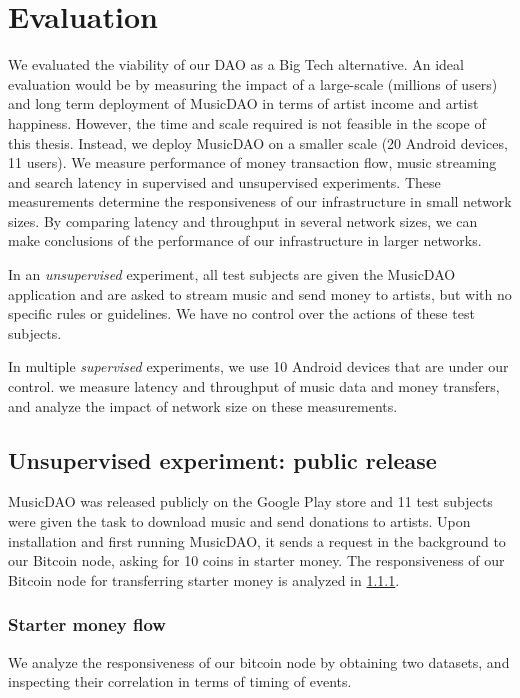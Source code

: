 \chapter{\label{chap:evaluation}Evaluation}
We evaluated the viability of our DAO as a Big Tech alternative. An ideal evaluation would be by measuring the impact of a large-scale (millions of users) and long term deployment of MusicDAO in terms of artist income and artist happiness. However, the time and scale required is not feasible in the scope of this thesis. Instead, we deploy MusicDAO on a smaller scale (20 Android devices, 11 users). We measure performance of money transaction flow, music streaming and search latency in supervised and unsupervised experiments. These measurements determine the responsiveness of our infrastructure in small network sizes. By comparing latency and throughput in several network sizes, we can make conclusions of the performance of our infrastructure in larger networks.

In an \textit{unsupervised} experiment, all test subjects are given the MusicDAO application and are asked to stream music and send money to artists, but with no specific rules or guidelines. We have no control over the actions of these test subjects.

In multiple \textit{supervised} experiments, we use 10 Android devices that are under our control. we measure latency and throughput of music data and money transfers, and analyze the impact of network size on these measurements.


\section{Unsupervised experiment: public release}
MusicDAO was released publicly on the Google Play store and 11 test subjects were given the task to download music and send donations to artists. Upon installation and first running MusicDAO, it sends a request in the background to our Bitcoin node, asking for 10 coins in starter money. The responsiveness of our Bitcoin node for transferring starter money is analyzed in \ref{starter-money-flow}.

\subsection{Starter money flow}
\label{starter-money-flow}
We analyze the responsiveness of our bitcoin node by obtaining two datasets, and inspecting their correlation in terms of timing of events.

